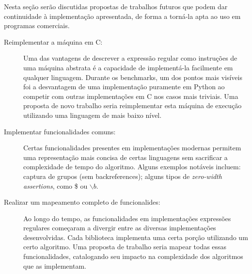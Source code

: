 \documentclass[a4paper,12pt,oneside,onecolumn]{uerj}
\begin{document}
Nesta seção serão discutidas propostas de trabalhos futuros que podem dar continuidade à implementação apresentada, de forma a torná-la apta ao uso em programas comerciais.

\begin{description}
	\item[Reimplementar a máquina em C:] Uma das vantagens de descrever a expressão regular como instruções de uma máquina abstrata é a capacidade de implementá-la facilmente em qualquer linguagem. Durante os benchmarks, um dos pontos mais visíveis foi a desvantagem de uma implementação puramente em Python ao competir com outras implementações em C nos casos mais triviais. Uma proposta de novo trabalho seria reimplementar esta máquina de execução utilizando uma linguagem de mais baixo nível.
	
	\item[Implementar funcionalidades comuns:] Certas funcionalidades presentes em implementações modernas permitem uma representação mais concisa de certas linguagens sem sacrificar a complexidade de tempo do algoritmo. Alguns exemplos notáveis incluem: captura de grupos (sem backreferences); alguns tipos de \emph{zero-width assertions}, como \$ ou $\backslash b$.
	
	\item[Realizar um mapeamento completo de funcionalides:] Ao longo do tempo, as funcionalidades em implementações expressões regulares começaram a divergir entre as diversas implementações desenvolvidas. Cada biblioteca implementa uma certa porção utilizando um certo algoritmo. Uma proposta de trabalho seria mapear todas essas funcionalidades, catalogando seu impacto na complexidade dos algoritmos que as implementam.
	
	
\end{description}



\backmatter

\appendix

\label{app:full_source}



\label{app:view_source}



\label{app:benchmarks_source}
\end{document}
